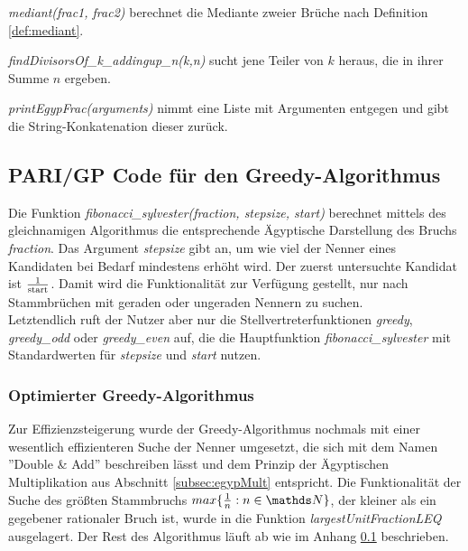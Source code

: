 \emph{mediant(frac1, frac2)} berechnet die Mediante zweier Brüche nach Definition \ref{def:mediant}.


\emph{findDivisorsOf\_k\_addingup\_n(k,n)} sucht jene Teiler von $k$ heraus, die in ihrer Summe $n$ ergeben.


\emph{printEgypFrac(arguments)} nimmt eine Liste mit Argumenten entgegen und gibt die String-Konkatenation dieser zurück.



\subsection{PARI/GP Code für den Greedy-Algorithmus}\label{code:greedy}
Die Funktion \emph{fibonacci\_sylvester(fraction, stepsize, start)} berechnet mittels des gleichnamigen Algorithmus die entsprechende Ägyptische Darstellung des Bruchs \emph{fraction}. Das Argument \emph{stepsize} gibt an, um wie viel der Nenner eines Kandidaten bei Bedarf mindestens erhöht wird. Der zuerst untersuchte Kandidat ist $\frac{1}{\text{start}}$. Damit wird die Funktionalität zur Verfügung gestellt, \bspw nur nach Stammbrüchen mit geraden oder ungeraden Nennern zu suchen.\\
Letztendlich ruft der Nutzer aber nur die Stellvertreterfunktionen \emph{greedy}, \emph{greedy\_odd} oder \emph{greedy\_even} auf, die die Hauptfunktion \emph{fibonacci\_sylvester} mit Standardwerten für \emph{stepsize} und \emph{start} nutzen.



\subsubsection{Optimierter Greedy-Algorithmus}\label{code:greedy_fast}
Zur Effizienzsteigerung wurde der Greedy-Algorithmus nochmals mit einer wesentlich effizienteren Suche der Nenner umgesetzt, die sich mit dem Namen ''Double \& Add'' beschreiben lässt und dem Prinzip der Ägyptischen Multiplikation aus Abschnitt \ref{subsec:egypMult} entspricht. Die Funktionalität der Suche des größten Stammbruchs $max\{\uf{n}: n \in \N\}$, der kleiner als ein gegebener rationaler Bruch ist, wurde in die Funktion \emph{largestUnitFractionLEQ} ausgelagert. Der Rest des Algorithmus läuft ab wie im Anhang \ref{code:greedy} beschrieben.



